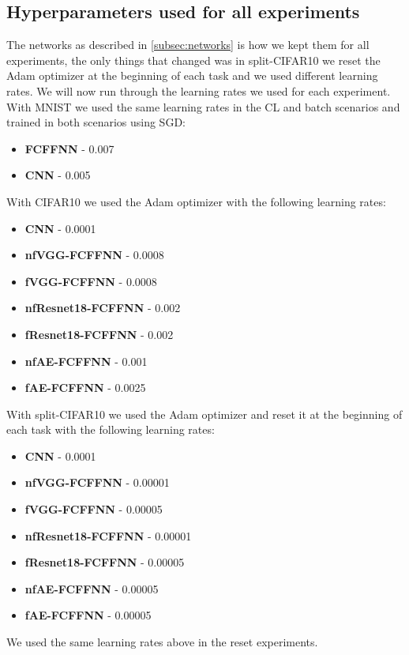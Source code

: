 \begin{appendices}
\section{Hyperparameters used for all experiments}
\label{sec:hyperparameters}
The networks as described in \cref{subsec:networks} is how we kept them for all experiments, the only things that changed was in split-CIFAR10 we reset the Adam optimizer at the beginning of each task and we used different learning rates. We will now run through the learning rates we used for each experiment. With MNIST we used the same learning rates in the CL and batch scenarios and trained in both scenarios using SGD:
\begin{itemize}
    \item \textbf{FCFFNN} - 0.007
    \item \textbf{CNN} - 0.005
\end{itemize}
With CIFAR10 we used the Adam optimizer with the following learning rates:
\begin{itemize}
    \item \textbf{CNN} - 0.0001
    \item \textbf{nfVGG-FCFFNN} - 0.0008
    \item \textbf{fVGG-FCFFNN} - 0.0008
    \item \textbf{nfResnet18-FCFFNN} - 0.002
    \item \textbf{fResnet18-FCFFNN} - 0.002
    \item \textbf{nfAE-FCFFNN} - 0.001
    \item \textbf{fAE-FCFFNN} - 0.0025
\end{itemize}
With split-CIFAR10 we used the Adam optimizer and reset it at the beginning of each task with the following learning rates:
\begin{itemize}
    \item \textbf{CNN} - 0.0001
    \item \textbf{nfVGG-FCFFNN} - 0.00001
    \item \textbf{fVGG-FCFFNN} - 0.00005
    \item \textbf{nfResnet18-FCFFNN} - 0.00001
    \item \textbf{fResnet18-FCFFNN} - 0.00005
    \item \textbf{nfAE-FCFFNN} - 0.00005
    \item \textbf{fAE-FCFFNN} - 0.00005
\end{itemize}
We used the same learning rates above in the reset experiments.

\end{appendices}